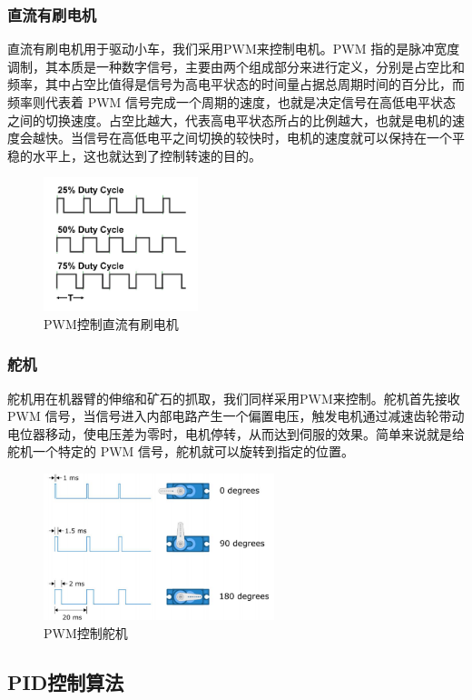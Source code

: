 \documentclass[10pt]{ctexart}
\begin{document}
\subsubsection{直流有刷电机}
直流有刷电机用于驱动小车，我们采用PWM来控制电机。PWM 指的是脉冲宽度调制，其本质是一种数字信号，主要由两个组成部分来进行定义，分别是占空比和频率，其中占空比值得是信号为高电平状态的时间量占据总周期时间的百分比，而频率则代表着 PWM 信号完成一个周期的速度，也就是决定信号在高低电平状态之间的切换速度。占空比越大，代表高电平状态所占的比例越大，也就是电机的速度会越快。当信号在高低电平之间切换的较快时，电机的速度就可以保持在一个平稳的水平上，这也就达到了控制转速的目的。
\begin{figure}[H]
    \centering
    \includegraphics[width = 0.4\textwidth]{algo/PWM.jpg}
    \caption{PWM控制直流有刷电机}
    \label{fig:dianji}
\end{figure}
\subsubsection{舵机}
舵机用在机器臂的伸缩和矿石的抓取，我们同样采用PWM来控制。舵机首先接收PWM 信号，当信号进入内部电路产生一个偏置电压，触发电机通过减速齿轮带动电位器移动，使电压差为零时，电机停转，从而达到伺服的效果。简单来说就是给舵机一个特定的 PWM 信号，舵机就可以旋转到指定的位置。
\begin{figure}[H]
    \centering
    \includegraphics[width = 0.6\textwidth]{algo/duoji.png}
    \caption{PWM控制舵机}
    \label{fig:duoji}
\end{figure}
\subsection{PID控制算法}
\end{document}
